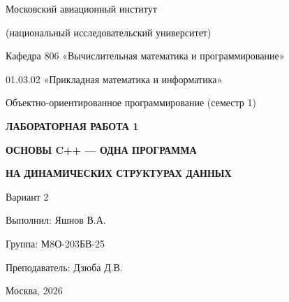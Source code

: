 \begin{titlepage}
\thispagestyle{empty}
\centering

{\Large Московский авиационный институт\par}
{\large (национальный исследовательский университет)\par}

\vspace{0.6cm}

{\large Кафедра 806 «Вычислительная математика и программирование»\par}
\vspace{0.3cm}
{\large 01.03.02 «Прикладная математика и информатика»\par}

\vspace{0.4cm}

{\large Объектно-ориентированное программирование (семестр 1)\par}

\vfill

{\LARGE\bfseries ЛАБОРАТОРНАЯ РАБОТА 1\par}
\vspace{0.4cm}
{\Large\bfseries ОСНОВЫ C++ --- ОДНА ПРОГРАММА\par}
\vspace{0.2cm}
{\Large\bfseries НА ДИНАМИЧЕСКИХ СТРУКТУРАХ ДАННЫХ\par}

\vspace{1.4cm}

{\large Вариант 2\par}

\vfill

\begin{flushright}
\begin{minipage}{0.55\textwidth}
Выполнил: Яшнов В.А.

\vspace{0.5cm}

Группа: М8О-203БВ-25

\vspace{0.5cm}

Преподаватель: Дзюба Д.В.
\end{minipage}
\end{flushright}

\vspace{0.8cm}

{\large Москва, 2026\par}

\end{titlepage}

\tableofcontents
\clearpage
{}
\setcounter{page}{2}

